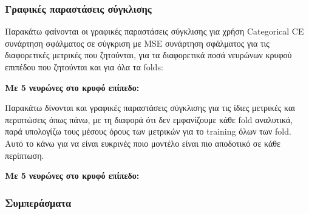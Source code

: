 \documentclass[12pt,a4paper]{article}
\begin{document}
\subsubsection{Γραφικές παραστάσεις σύγκλισης}

Παρακάτω φαίνονται οι γραφικές παραστάσεις σύγκλισης για χρήση Categorical CE συνάρτηση σφάλματος σε σύγκριση με MSE συνάρτηση σφάλματος για τις διαφορετικές μετρικές που ζητούνται, για τα διαφορετικά ποσά νευρώνων κρυφού επιπέδου που ζητούνται και για όλα τα folds:

\textbf{Με 5 νευρώνες στο κρυφό επίπεδο:}


Παρακάτω δίνονται και γραφικές παραστάσεις σύγκλισης για τις ίδιες μετρικές και περιπτώσεις όπως πάνω, με τη διαφορά ότι δεν εμφανίζουμε κάθε fold αναλυτικά, παρά υπολογίζω τους μέσους όρους των μετρικών για το training όλων των fold. Αυτό το κάνω για να είναι ευκρινές ποιο μοντέλο είναι πιο αποδοτικό σε κάθε περίπτωση.

\textbf{Με 5 νευρώνες στο κρυφό επίπεδο:}


\subsubsection{Συμπεράσματα}
\end{document}
